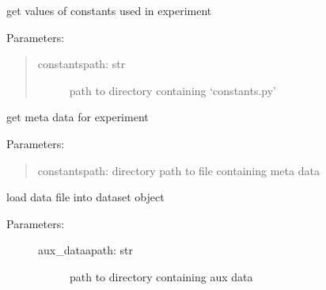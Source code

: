 \documentclass[letterpaper,10pt,english]{sphinxmanual}
\begin{document}
\begin{fulllineitems}
\begin{fulllineitems}
\begin{description}
\begin{description}
\end{description}

\end{description}

\end{fulllineitems}


\begin{fulllineitems}
\label{\detokenize{code:ATom.atom_functions.dataset.get_constants}}
get values of constants used in experiment

Parameters:
\begin{quote}
\begin{description}
\item[{constantspath: str}] \leavevmode
path to directory containing ‘constants.py’

\end{description}
\end{quote}

\end{fulllineitems}


\begin{fulllineitems}
\label{\detokenize{code:ATom.atom_functions.dataset.get_meta}}
get meta data for experiment

Parameters:
\begin{quote}

constantspath: directory path to file containing meta data
\end{quote}

\end{fulllineitems}


\begin{fulllineitems}
\label{\detokenize{code:ATom.atom_functions.dataset.load_aux}}
load data file into dataset object
\begin{description}
\item[{Parameters:}] \leavevmode\begin{description}
\item[{aux\_dataapath: str}] \leavevmode
path to directory containing aux data


\end{description}
\end{description}
\end{fulllineitems}
\end{fulllineitems}
\end{document}
